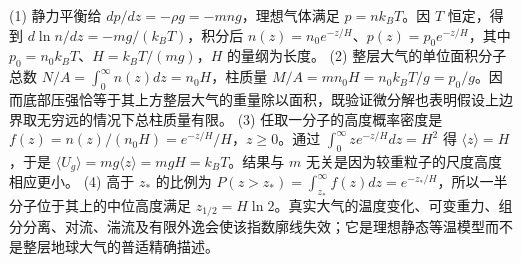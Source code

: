 (1) 静力平衡给 \(dp/dz=-\rho g=-mng\)，理想气体满足 \(p=nk_BT\)。因 \(T\) 恒定，得到 \(d\ln n/dz=-mg/(k_BT)\)，积分后 \(n(z)=n_0e^{-z/H}\)、\(p(z)=p_0e^{-z/H}\)，其中 \(p_0=n_0k_BT\)、\(H=k_BT/(mg)\)，\(H\) 的量纲为长度。
(2) 整层大气的单位面积分子总数 \(N/A=\int_0^\infty n(z)dz=n_0H\)，柱质量 \(M/A=mn_0H=n_0k_BT/g=p_0/g\)。因而底部压强恰等于其上方整层大气的重量除以面积，既验证微分解也表明假设上边界取无穷远的情况下总柱质量有限。
(3) 任取一分子的高度概率密度是 \(f(z)=n(z)/(n_0H)=e^{-z/H}/H\)，\(z\ge0\)。通过 \(\int_0^\infty z e^{-z/H}dz=H^2\) 得 \(\langle z\rangle=H\)，于是 \(\langle U_g\rangle=mg\langle z\rangle=mgH=k_BT\)。结果与 \(m\) 无关是因为较重粒子的尺度高度相应更小。
(4) 高于 \(z_*\) 的比例为 \(P(z>z_*)=\int_{z_*}^\infty f(z)dz=e^{-z_*/H}\)，所以一半分子位于其上的中位高度满足 \(z_{1/2}=H\ln2\)。真实大气的温度变化、可变重力、组分分离、对流、湍流及有限外逸会使该指数廓线失效；它是理想静态等温模型而不是整层地球大气的普适精确描述。
